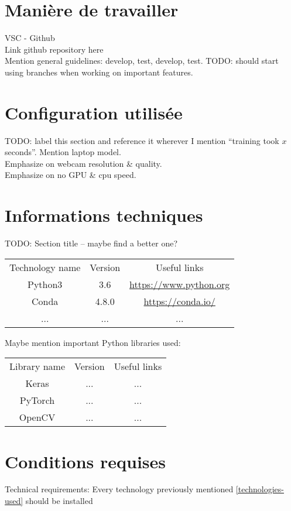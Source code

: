 \section{Manière de travailler}
VSC - Github\\
Link github repository here\\
Mention general guidelines: develop, test, develop, test.
TODO: should start using branches when working on important features.

\section{Configuration utilisée}
TODO: label this section and reference it wherever I mention ``training took $x$ seconds''.
Mention laptop model.\\
Emphasize on webcam resolution \& quality.\\
Emphasize on no GPU \& cpu speed.\\

\section{Informations techniques}
TODO: Section title – maybe find a better one?

\begin{center}
    \label{technologies-used}
    \begin{tabular}{ c c c }
        Technology name & Version & Useful links \\
        Python3 & 3.6 & \url{https://www.python.org} \\
        Conda & 4.8.0 & \url{https://conda.io/} \\
        ... & ... & ...
    \end{tabular}
\end{center}

Maybe mention important Python libraries used:\\

\begin{center}
    \begin{tabular}{ c c c }
        Library name & Version & Useful links \\
        Keras & ... & ... \\
        PyTorch & ... & ... \\
        OpenCV & ... & ...
    \end{tabular}
\end{center}

\section{Conditions requises}
Technical requirements: Every technology previously mentioned \ref{technologies-used} should be installed \\

